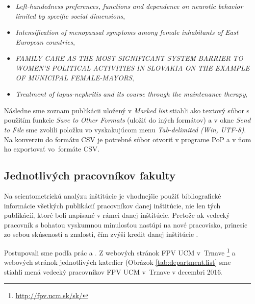 \begin{itemize} 
  \item \emph{Left-handedness preferences, functions and dependence on neurotic
    behavior limited by specific social dimensions},
  \item \emph{Intensification of menopausal symptoms among female inhabitants
    of East European countries}, 
  \item \emph{FAMILY CARE AS THE MOST SIGNIFICANT SYSTEM BARRIER TO WOMEN'S
    POLITICAL ACTIVITIES IN SLOVAKIA ON THE EXAMPLE OF MUNICIPAL
    FEMALE-MAYORS},
  \item \emph{Treatment of lupus-nephritis and its course through the
    maintenance therapy},
\end{itemize}

Následne sme zoznam publikácii uložený v \emph{Marked list} stiahli ako textový
súbor s použitím funkcie \emph{Save to Other Formats} (uložiť do iných
formátov) a v okne \emph{Send to File} sme zvolili položku vo vyskakujúcom menu
\emph{Tab-delimited (Win, UTF-8)}. Na konverziu do formátu CSV je potrebné
súbor otvoriť v programe PoP \citep{Harzing2011} a v ňom ho exportovať vo~formáte CSV.

\subsection{Jednotlivých pracovníkov fakulty}

Na scientometrickú analýzu inštitúcie je vhodnejšie použiť bibliografické
informácie všetkých publikácií pracovníkov danej inštitúcie, nie len tých
publikácií, ktoré boli napísané v rámci danej inštitúcie. Pretože ak vedecký
pracovník s bohatou vyskumnou minulosťou nastúpi na nové pracovisko, prinesie
zo sebou skúsenosti a znalosti, čím zvýši kredit danej inštitúcie
\citep{Altanopoulou2012}. 

Postupovali sme podľa prác \citet{Kazakis2014a} a
\citet{Kazakis2014b,Kazakis2015}.  Z webových stránok FPV UCM v~Trnave
\footnote{\url{http://fpv.ucm.sk/sk/}} a webových stránok jednotlivých katedier
(Obrázok \ref{tab:department.list} sme stiahli mená vedecký pracovníkov FPV UCM v~Trnave
v decembri 2016.

